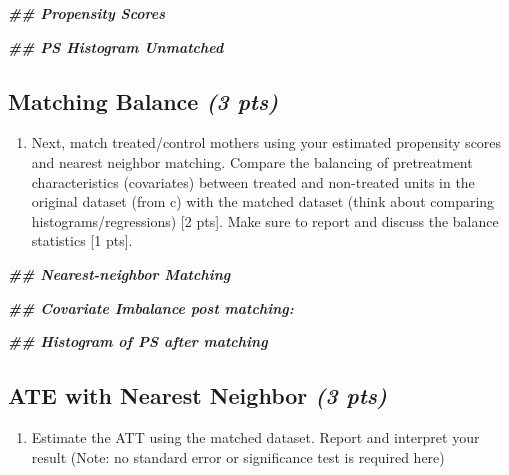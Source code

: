\documentclass[
]{article}
\newenvironment{Shaded}{\begin{snugshade}}{\end{snugshade}}
\newcommand{\DocumentationTok}[1]{\textcolor[rgb]{0.56,0.35,0.01}{\textbf{\textit{#1}}}}
\providecommand{\tightlist}{%
  \setlength{\itemsep}{0pt}\setlength{\parskip}{0pt}}
\begin{document}
\begin{Shaded}
\begin{Highlighting}[]
\DocumentationTok{\#\# Propensity Scores}


\DocumentationTok{\#\# PS Histogram Unmatched }
\end{Highlighting}
\end{Shaded}

\hypertarget{matching-balance-3-pts}{%
\subsection{\texorpdfstring{Matching Balance \emph{(3
pts)}}{Matching Balance (3 pts)}}\label{matching-balance-3-pts}}

\begin{enumerate}
\def\labelenumi{(\alph{enumi})}
\setcounter{enumi}{3}
\tightlist
\item
  Next, match treated/control mothers using your estimated propensity
  scores and nearest neighbor matching. Compare the balancing of
  pretreatment characteristics (covariates) between treated and
  non-treated units in the original dataset (from c) with the matched
  dataset (think about comparing histograms/regressions) {[}2 pts{]}.
  Make sure to report and discuss the balance statistics {[}1 pts{]}.
\end{enumerate}

\begin{Shaded}
\begin{Highlighting}[]
\DocumentationTok{\#\# Nearest{-}neighbor Matching}

\DocumentationTok{\#\# Covariate Imbalance post matching: }


\DocumentationTok{\#\# Histogram of PS after matching}
\end{Highlighting}
\end{Shaded}

\hypertarget{ate-with-nearest-neighbor-3-pts}{%
\subsection{\texorpdfstring{ATE with Nearest Neighbor \emph{(3
pts)}}{ATE with Nearest Neighbor (3 pts)}}\label{ate-with-nearest-neighbor-3-pts}}

\begin{enumerate}
\def\labelenumi{(\alph{enumi})}
\setcounter{enumi}{4}
\tightlist
\item
  Estimate the ATT using the matched dataset. Report and interpret your
  result (Note: no standard error or significance test is required here)
\end{enumerate}
\end{document}
